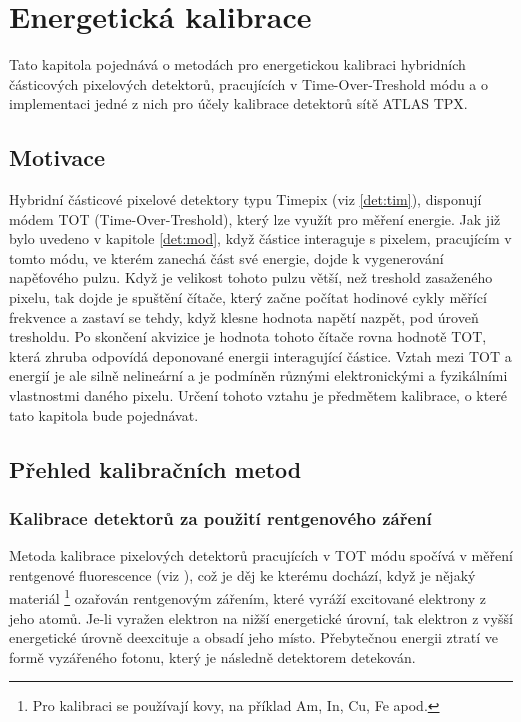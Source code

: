 

\chapter{Energetická kalibrace}\label{calib}
Tato kapitola pojednává o metodách pro energetickou kalibraci hybridních částicových pixelových detektorů, pracujících v Time-Over-Treshold módu a o implementaci jedné z nich pro účely kalibrace detektorů sítě ATLAS TPX.

\section{Motivace}
Hybridní částicové pixelové detektory typu Timepix (viz \ref{det:tim}), disponují módem TOT (Time-Over-Treshold), který lze využít pro měření energie. Jak již bylo uvedeno v kapitole \ref{det:mod}, když částice interaguje s pixelem, pracujícím v tomto módu, ve kterém zanechá část své energie, dojde k vygenerování napěťového pulzu. Když je velikost tohoto pulzu větší, než treshold zasaženého pixelu, tak dojde je spuštění čítače, který začne počítat hodinové cykly měřící frekvence a zastaví se tehdy, když klesne hodnota napětí nazpět, pod úroveň tresholdu. Po skončení akvizice je hodnota tohoto čítače rovna hodnotě TOT, která zhruba odpovídá deponované energii interagující částice. Vztah mezi TOT a energií je ale silně nelineární a je podmíněn různými elektronickými a fyzikálními vlastnostmi daného pixelu. Určení tohoto vztahu je předmětem kalibrace, o které tato kapitola bude pojednávat.

\section{Přehled kalibračních metod}

\subsection{Kalibrace detektorů za použití rentgenového záření}\label{calib:xray}
Metoda kalibrace pixelových detektorů pracujících v TOT módu \cite{Jakubek2011S262} spočívá v měření rentgenové fluorescence (viz \cite{Jakubek-radiography_and_charge_sharing}),
což je děj ke kterému dochází, když je nějaký materiál 
\footnote{Pro kalibraci se používají kovy, na příklad Am, In, Cu, Fe apod.}
ozařován rentgenovým zářením, které vyráží excitované elektrony z jeho atomů. Je-li vyražen elektron na nižší energetické úrovní, tak elektron z vyšší energetické úrovně deexcituje a obsadí jeho místo. Přebytečnou energii ztratí ve formě vyzářeného fotonu, který je následně detektorem detekován. 

